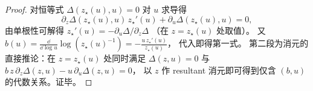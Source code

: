 \begin{proof}
对恒等式 \(\Delta(z_\star(u),u)=0\) 对 \(u\) 求导得
\[
\partial_z\Delta(z_\star(u),u)\,z_\star'(u)+\partial_u\Delta(z_\star(u),u)=0,
\]
由单根性可解得
\(
z_\star'(u)=-\partial_u\Delta/\partial_z\Delta
\)
（在 \(z=z_\star(u)\) 处取值）。
又
\(
b(u)=\frac{\dd}{\dd\log u}\log(z_\star(u)^{-1})=-\frac{u\,z_\star'(u)}{z_\star(u)}
\)，
代入即得第一式。
第二段为消元的直接推论：在 \(z=z_\star(u)\) 处同时满足
\(
\Delta(z,u)=0
\)
与
\(
b\,z\,\partial_z\Delta(z,u)-u\,\partial_u\Delta(z,u)=0
\)，
以 \(z\) 作 resultant 消元即可得到仅含 \((b,u)\) 的代数关系。证毕。
\end{proof}
